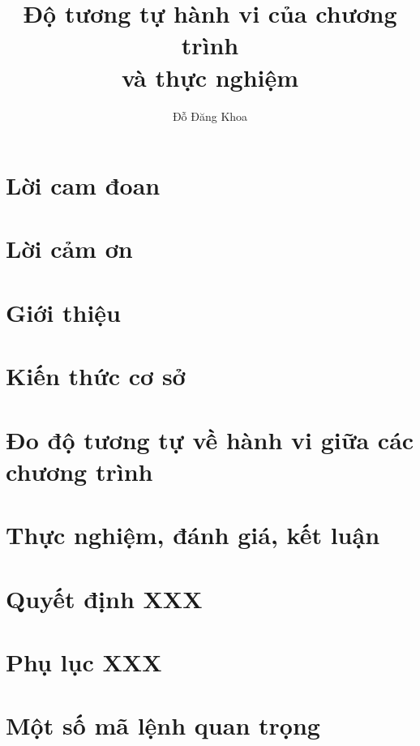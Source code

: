 \documentclass[a4paper,oneside,openright]{memoir}
\title{Độ tương tự hành vi của chương trình \\ và thực nghiệm}
\author{Đỗ Đăng Khoa}
\begin{document}




\chapter*{Lời cam đoan}


\chapter*{Lời cảm ơn}




\newpage
\tableofcontents




\chapter{Giới thiệu}


\chapter{Kiến thức cơ sở}


\chapter{Đo độ tương tự về hành vi giữa các chương trình}


\chapter{Thực nghiệm, đánh giá, kết luận}




\nocite{*} %


\appendix

\chapter{Quyết định XXX}

%

\chapter{Phụ lục XXX}


\chapter{Một số mã lệnh quan trọng}

\end{document}
